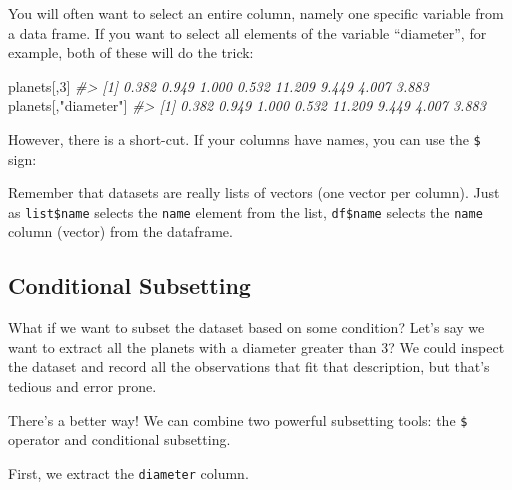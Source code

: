 \documentclass[]{book}
\newenvironment{Shaded}{\begin{snugshade}}{\end{snugshade}}
\newcommand{\CommentTok}[1]{\textcolor[rgb]{0.56,0.35,0.01}{\textit{#1}}}
\newcommand{\DecValTok}[1]{\textcolor[rgb]{0.00,0.00,0.81}{#1}}
\newcommand{\NormalTok}[1]{#1}
\newcommand{\OperatorTok}[1]{\textcolor[rgb]{0.81,0.36,0.00}{\textbf{#1}}}
\newcommand{\StringTok}[1]{\textcolor[rgb]{0.31,0.60,0.02}{#1}}
\begin{document}
You will often want to select an entire column, namely one specific variable from a data frame. If you want to select all elements of the variable ``diameter'', for example, both of these will do the trick:

\begin{Shaded}
\begin{Highlighting}[]
\NormalTok{planets[,}\DecValTok{3}\NormalTok{]}
\CommentTok{#> [1]  0.382  0.949  1.000  0.532 11.209  9.449  4.007  3.883}
\NormalTok{planets[,}\StringTok{"diameter"}\NormalTok{]}
\CommentTok{#> [1]  0.382  0.949  1.000  0.532 11.209  9.449  4.007  3.883}
\end{Highlighting}
\end{Shaded}

However, there is a short-cut. If your columns have names, you can use the \texttt{\$} sign:

\begin{Shaded}
\end{Shaded}

Remember that datasets are really lists of vectors (one vector per column). Just as \texttt{list\$name} selects the \texttt{name} element from the list, \texttt{df\$name} selects the \texttt{name} column (vector) from the dataframe.

\hypertarget{conditional-subsetting-1}{%
\subsection{Conditional Subsetting}\label{conditional-subsetting-1}}

What if we want to subset the dataset based on some condition? Let's say we want to extract all the planets with a diameter greater than 3? We could inspect the dataset and record all the observations that fit that description, but that's tedious and error prone.

There's a better way! We can combine two powerful subsetting tools: the \texttt{\$} operator and conditional subsetting.

First, we extract the \texttt{diameter} column.

\begin{Shaded}
\end{Shaded}
\end{document}
